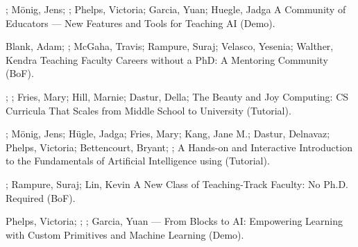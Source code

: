 \begin{etaremune}
    \setlength\itemsep{1em}


    \item{\me; Mönig, Jens; \dan; Phelps, Victoria; Garcia, Yuan; Huegle, Jadga
    \newline A Community of \snap{} Educators — New Features and Tools for Teaching AI (Demo). }

    \item{Blank, Adam; \me; McGaha, Travis; Rampure, Suraj; Velasco, Yesenia; Walther, Kendra
    \newline Teaching Faculty Careers without a PhD: A Mentoring Community (BoF). }

    \item{\me; \dan; Fries, Mary; Hill, Marnie; Dastur, Della; \lauren
    \newline The Beauty and Joy Computing: CS Curricula That Scales from Middle School to University (Tutorial). }

    \item{\dan; Mönig, Jens; Hügle, Jadga; Fries, Mary; Kang, Jane M.; Dastur, Delnavaz; Phelps, Victoria; Bettencourt, Bryant; \me; \lauren
    \newline A Hands-on and Interactive Introduction to the Fundamentals of Artificial Intelligence using \snap{} (Tutorial). }




    \item{\me; Rampure, Suraj; Lin, Kevin
    \newline A New Class of Teaching-Track Faculty: No Ph.D. Required (BoF). }

    \item{Phelps, Victoria; \me; \dan; Garcia, Yuan
    \newline {} — From Blocks to AI: Empowering Learning with Custom Primitives and Machine Learning (Demo). }
    

\end{etaremune}
